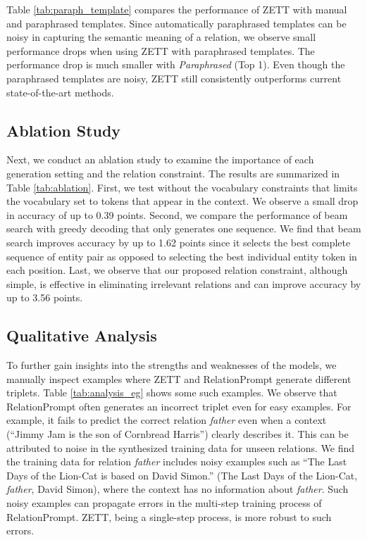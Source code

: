 Table \ref{tab:paraph_template} compares the performance of ZETT with manual and paraphrased templates. {Since automatically paraphrased templates can be noisy in capturing the semantic meaning of a relation, we observe small performance drops when using ZETT with paraphrased templates. The performance drop is much smaller with \textit{Paraphrased} (Top 1). Even though the paraphrased templates are noisy, ZETT still consistently outperforms current state-of-the-art methods.}

\subsection{Ablation Study}
\label{sec:ablation_study}
Next, we conduct an ablation study to examine the importance of each generation setting and the relation constraint. The results are summarized in Table \ref{tab:ablation}. First, {we test without the vocabulary constraints that limits the vocabulary set to tokens that appear in the context. We observe a small drop in accuracy of up to 0.39 points. Second, we compare the performance of beam search with greedy decoding that only generates one sequence. We find that beam search improves accuracy by up to 1.62 points since it selects the best complete sequence of entity pair as opposed to selecting the best individual entity token in each position. Last, we observe that our proposed relation constraint, although simple, is effective in eliminating irrelevant relations and can improve accuracy by up to 3.56 points.}

\subsection{Qualitative Analysis}

{To further gain insights into the strengths and weaknesses of the models, we manually inspect examples where ZETT and RelationPrompt generate different triplets. Table \ref{tab:analysis_eg} shows some such examples. We observe that RelationPrompt often generates an incorrect triplet even for easy examples. For example, it fails to predict the correct relation \textit{father} even when a context (``Jimmy Jam is the son of Cornbread Harris'') clearly describes it. This can be attributed to noise in the synthesized training data for unseen relations. We find the training data for relation \textit{father} includes noisy examples such as ``The Last Days of the Lion-Cat is based on David Simon.''  (The Last Days of the Lion-Cat, \textit{father}, David Simon), where the context has no information about \textit{father}. Such noisy examples can propagate errors in the multi-step training process of RelationPrompt. ZETT, being a single-step process, is more robust to such errors.}

